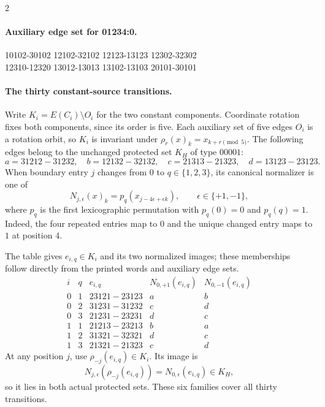 \begin{multicols}{2}
\paragraph{Auxiliary edge set for 01234:0.}
\begingroup\footnotesize\ttfamily\begin{flushleft}
10102-30102 12102-32102 12123-13123 12302-32302\\
12310-12320 13012-13013 13102-13103 20101-30101\\
\end{flushleft}\endgroup
\end{multicols}
\endgroup
\paragraph{The thirty constant-source transitions.}
Write $K_i=E(C_i)\setminus O_i$ for the two constant components.
Coordinate rotation fixes both components, since its order is five.
Each auxiliary set of five edges $O_i$ is a rotation orbit, so $K_i$ is invariant
under $\rho_r(x)_k=x_{k+r\pmod5}$. The following edges belong to
the unchanged protected set $K_H$ of type $00001$:
\[
a=31212\!-31232,\quad b=12132\!-32132,\quad
c=21313\!-21323,\quad d=13123\!-23123.
\]
When boundary entry $j$ changes from $0$ to $q\in\{1,2,3\}$,
its canonical normalizer is one of
\[
 N_{j,\epsilon}(x)_k=p_q(x_{j-4\epsilon+\epsilon k}),
 \qquad \epsilon\in\{+1,-1\},
\]
where $p_q$ is the first lexicographic permutation with $p_q(0)=0$
and $p_q(q)=1$. Indeed, the four repeated entries map to $0$ and
the unique changed entry maps to $1$ at position $4$.
\par{}
The table gives $e_{i,q}\in K_i$ and its two normalized images;
these memberships follow directly from the printed words and auxiliary edge sets.
\[
\begin{array}{cc|c|cc}
i&q&e_{i,q}&N_{0,+1}(e_{i,q})&N_{0,-1}(e_{i,q})\\ \hline
0&1&23121\!-23123&a&b\\
0&2&31231\!-31232&c&d\\
0&3&21231\!-23231&d&c\\
1&1&21213\!-23213&b&a\\
1&2&31321\!-32321&d&c\\
1&3&21321\!-21323&c&d
\end{array}
\]
At any position $j$, use $\rho_{-j}(e_{i,q})\in K_i$. Its image is
\[
 N_{j,\epsilon}(\rho_{-j}(e_{i,q}))
      =N_{0,\epsilon}(e_{i,q})\in K_H,
\]
so it lies in both actual protected sets. These six families cover
all thirty transitions.

